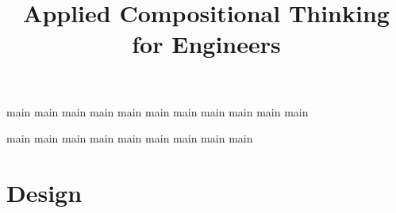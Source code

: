 \pagestyle{scrheadings}

\ohead{\pagemark}
\ihead{\headmark}
\cfoot{}
\dominitoc
\doparttoc
\setcounter{parttocdepth}{0}
\setcounter{minitocdepth}{1}

\title{Applied Compositional Thinking\\ for Engineers}
\date{}





\setcounter{tocdepth}{1}



\tableofcontents


{main}
{main}
{main}
{main}
{main}
{main}
{main}
{main}
{main}
{main}
{main}

{main}
{main}
{main}
{main}
{main}
{main}
{main}
{main}
{main}


\part{Design}
\label{part:co-design}

